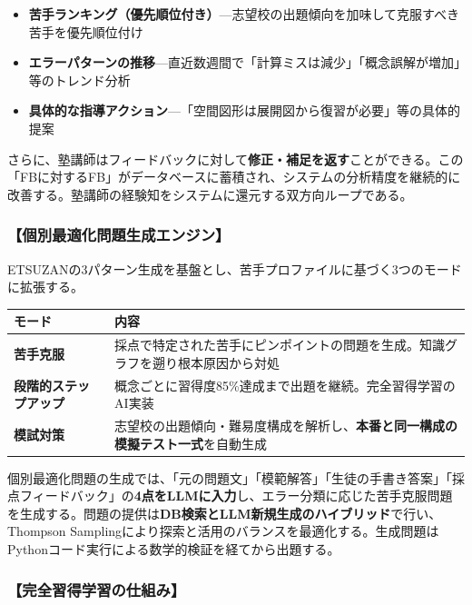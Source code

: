 \documentclass[paper=a4,fontsize=10.5bp,jafontsize=10.5bp,twocolumn]{jlreq}
\begin{document}
\begin{itemize}
  \item \textbf{苦手ランキング（優先順位付き）}---志望校の出題傾向を加味して克服すべき苦手を優先順位付け
  \item \textbf{エラーパターンの推移}---直近数週間で「計算ミスは減少」「概念誤解が増加」等のトレンド分析
  \item \textbf{具体的な指導アクション}---「空間図形は展開図から復習が必要」等の具体的提案
\end{itemize}

さらに、塾講師はフィードバックに対して\textbf{修正・補足を返す}ことができる。この「FBに対するFB」がデータベースに蓄積され、システムの分析精度を継続的に改善する。塾講師の経験知をシステムに還元する双方向ループである。

\subsubsection{【個別最適化問題生成エンジン】}

ETSUZANの3パターン生成を基盤とし、苦手プロファイルに基づく3つのモードに拡張する。

\begin{scriptsize}\noindent
\begin{tabularx}{\linewidth}{>{\bfseries}l X}
\toprule
モード & 内容 \\
\midrule
苦手克服 & 採点で特定された苦手にピンポイントの問題を生成。知識グラフを遡り根本原因から対処 \\
段階的ステップアップ & 概念ごとに習得度85\%達成まで出題を継続。完全習得学習のAI実装 \\
模試対策 & 志望校の出題傾向・難易度構成を解析し、\textbf{本番と同一構成の模擬テスト一式}を自動生成 \\
\bottomrule
\end{tabularx}
\end{scriptsize}

個別最適化問題の生成では、「元の問題文」「模範解答」「生徒の手書き答案」「採点フィードバック」の\textbf{4点をLLMに入力}し、エラー分類に応じた苦手克服問題を生成する。問題の提供は\textbf{DB検索とLLM新規生成のハイブリッド}で行い、Thompson Samplingにより探索と活用のバランスを最適化する。生成問題はPythonコード実行による数学的検証を経てから出題する。

\subsubsection{【完全習得学習の仕組み】}
\end{document}
